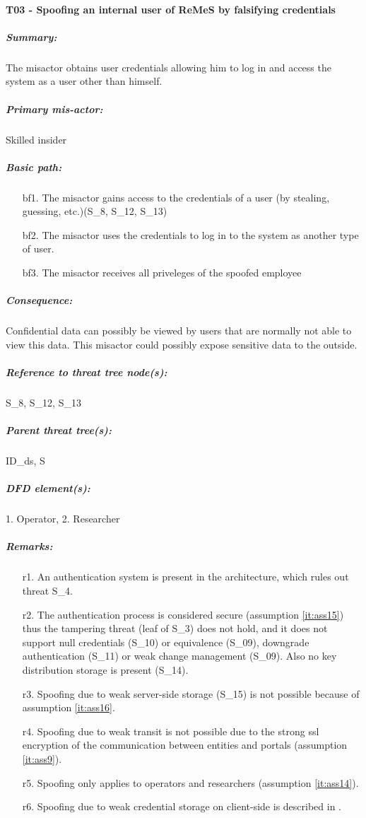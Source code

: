 

\paragraph{T03 - Spoofing an internal user of ReMeS by falsifying credentials}
\label{par:t03}
    \subparagraph{Summary:} The misactor obtains user credentials allowing him to log in and access the system as a user other than himself.
    \subparagraph{Primary mis-actor:} Skilled insider
    \subparagraph{Basic path:}
    \begin{enumerate}
        \item[bf1.]{The misactor gains access to the credentials of a user (by stealing, guessing, etc.)(S\_8, S\_12, S\_13)}
        \item[bf2.]{The misactor uses the credentials to log in to the system as another type of user.}
        \item[bf3.]{The misactor receives all priveleges of the spoofed employee}
    \end{enumerate}
    \subparagraph{Consequence:}
	Confidential data can possibly be viewed by users that are normally not able to view this data.
This misactor could possibly expose sensitive data to the outside.

    \subparagraph{Reference to threat tree node(s):}S\_8, S\_12, S\_13
    \subparagraph{Parent threat tree(s):} ID\_ds, S
    \subparagraph{DFD element(s):} 1. Operator, 2. Researcher
    \subparagraph{Remarks:}
    \begin{enumerate}
        \item[r1.] An authentication system is present in the architecture, which rules out threat S\_4.
        \item[r2.] The authentication process is considered secure (assumption \ref{it:ass15}) thus the tampering threat (leaf of S\_3) does not hold, 
and it does not support null credentials (S\_10) or equivalence (S\_09), downgrade authentication (S\_11) 
or weak change management (S\_09). Also no key distribution storage is present (S\_14).
	\item[r3.] Spoofing due to weak server-side storage (S\_15) is not possible because of assumption \ref{it:ass16}.
	\item[r4.] Spoofing due to weak transit is not possible due to the strong ssl encryption of the communication between entities and portals (assumption \ref{it:ass9}).
	\item[r5.] Spoofing only applies to operators and researchers (assumption \ref{it:ass14}).
	\item[r6.] Spoofing due to weak credential storage on client-side is described in .
    \end{enumerate}



